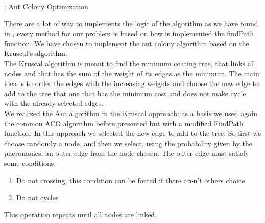 \begin{algorithm}
\caption{: Ant Colony Optimization} \label{alg:Ant}
\begin{algorithmic} 
\REPEAT
{}
\end{algorithmic}
\end{algorithm}

There are a lot of way to implements the logic of the algorithm as we have found in \cite{nedlin2017ant}, every method for our problem is based on how is implemented the findPath function. We have chosen to implement the ant colony algorithm based on the Kruscal’s algorithm. \\
The Kruscal algorithm \cite{kruskal1956shortest} is meant to find the minimum coating tree, that links all nodes and that has the sum of the weight of its edges as the minimum. The main idea is to order the edges with the increasing weights and choose the new edge to add to the tree that one that has the minimum cost and does not make cycle with the already selected edges.\\
We realized the Ant algorithm in the Kruscal approach: as a basis we used again the common ACO algorithm before presented but with a modified FindPath function. In this approach we selected the new edge to add to the tree. So first we choose randomly a node, and then we select, using the probability given by the pheromones, an outer edge from the node chosen. The outer edge must satisfy some conditions:
\begin{enumerate}
\setlength{\parskip}{0pt}
\setlength{\itemsep}{0pt plus 1pt}
\item Do not crossing, this condition can be forced if there aren’t others choice
\item Do not cycles
\end{enumerate}
This operation repeats until all nodes are linked.

